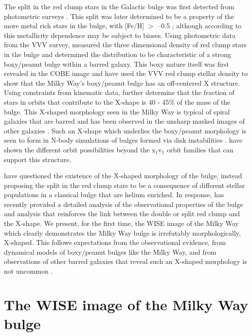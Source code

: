 \documentclass[12pt, preprint]{aastex}
\begin{document}
The split in the red clump stars in the Galactic bulge was first detected from photometric surveys \citep{McWilliam2010, Nataf2010}. This split was later determined to be a property of the more metal rich stars in the bulge, with [Fe/H] $>$ --0.5 \citep{Ness2012, Uttenthaler2012}; although according to \citet{Nataf2014} this metallicity dependence may be subject to biases. Using photometric data from the VVV survey, \citet{Wegg2013} measured the three dimensional density of red clump stars in the bulge and determined the distribution to be characteristic of a strong boxy/peanut bulge within a barred galaxy. This boxy nature itself was first revealed in the COBE image \citep{Dwek1995} and \citet{Portail2015a} have used the VVV red clump stellar density to show that the Milky Way's boxy/peanut bulge has an off-centered X structure. Using constraints from kinematic data, \citet{Portail2015b} further determine that the fraction of stars in orbits that contribute to the X-shape is 40 - 45\% of the mass of the bulge. This X-shaped morphology seen in the Milky Way is typical of spiral galaxies that are barred and has been observed in the unsharp masked images of other galaxies \citep[e.g.][]{Bureau2006}. Such an X-shape which underlies the boxy/peanut morphology is seen to form in N-body simulations of bulges formed via disk instabilities \citep[e.g.][]{Athanassoula2005, Debattista2006, Inma2006}. \citet{Portail2015b} have shown the different orbit possibilities beyond the x$_{1}$v$_{1}$ orbit families \citep[e.g.][]{P1991} that can support this structure.

\citet{Lee2015} have questioned the existence of the X-shaped morphology of the bulge, instead proposing the split in the red clump stars to be a consequence of different stellar populations in a classical bulge that are helium enriched. In response, \citet{Gonzalez2015} has recently provided a detailed analysis of the observational properties of the bulge and analysis that reinforces the link between the double or split red clump and the X-shape. We present, for the first time, the WISE image of the Milky Way \citep{Lang2014a} which clearly demonstrates the Milky Way bulge is irrefutably morphologically, X-shaped. This follows expectations from the observational evidence,  from dynamical models of boxy/peanut bulges like the Milky Way, and from observations of other barred galaxies that reveal such an X-shaped morphology is not uncommon \citep{L2014}. 

\section{The WISE image of the Milky Way bulge}
\end{document}

